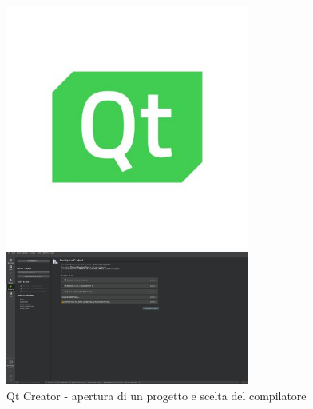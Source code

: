 \begin{figure}[h!]
    \centering
    \begin{minipage}{0.5\textwidth}
        \centering
        \includegraphics[width=8cm]{./figures/qtIcon.jpg} %
    \end{minipage}\hfill
    \begin{minipage}{0.5\textwidth}
        \centering
        \includegraphics[width=8cm]{./figures/qtCreator.png} %
        \caption{Qt Creator - apertura di un progetto e scelta del compilatore}                
    \end{minipage}
\end{figure}


